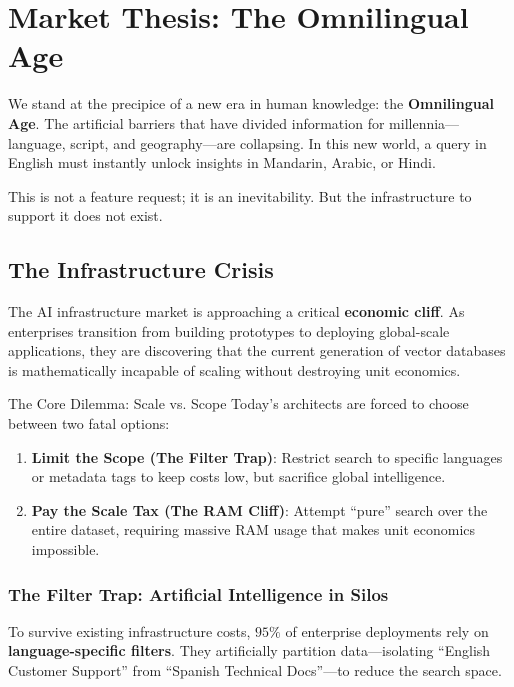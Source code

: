 \section{Market Thesis: The Omnilingual Age}

We stand at the precipice of a new era in human knowledge: the \textbf{Omnilingual Age}. The artificial barriers that have divided information for millennia—language, script, and geography—are collapsing. In this new world, a query in English must instantly unlock insights in Mandarin, Arabic, or Hindi.

This is not a feature request; it is an inevitability. But the infrastructure to support it does not exist.

\subsection{The Infrastructure Crisis}

The AI infrastructure market is approaching a critical \textbf{economic cliff}. As enterprises transition from building prototypes to deploying global-scale applications, they are discovering that the current generation of vector databases is mathematically incapable of scaling without destroying unit economics.

\begin{cosmabox}[cosmaOrange]{The Core Dilemma: Scale vs. Scope}
Today's architects are forced to choose between two fatal options:
\begin{enumerate}
    \item \textbf{Limit the Scope (The Filter Trap)}: Restrict search to specific languages or metadata tags to keep costs low, but sacrifice global intelligence.
    \item \textbf{Pay the Scale Tax (The RAM Cliff)}: Attempt ``pure'' search over the entire dataset, requiring massive RAM usage that makes unit economics impossible.
\end{enumerate}
\end{cosmabox}

\subsubsection{The Filter Trap: Artificial Intelligence in Silos}

To survive existing infrastructure costs, $95\%$ of enterprise deployments rely on \textbf{language-specific filters}. They artificially partition data—isolating ``English Customer Support'' from ``Spanish Technical Docs''—to reduce the search space.

